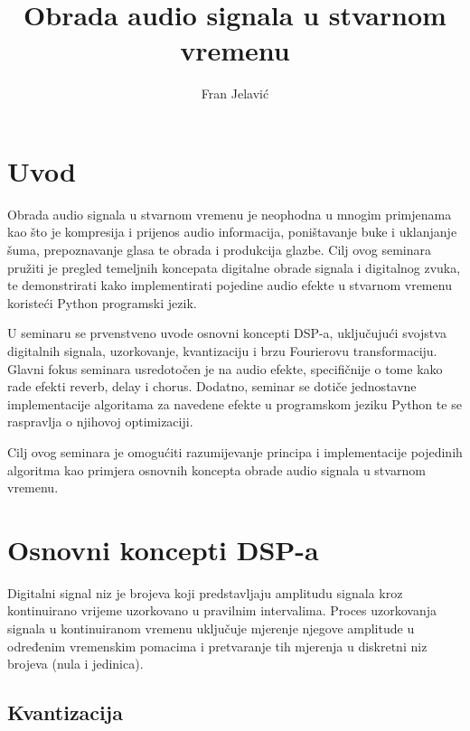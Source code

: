 \documentclass[times, utf8, seminar, numeric]{fer}
\begin{document}
\title{Obrada audio signala u stvarnom vremenu}

\author{Fran Jelavić}

\maketitle

\tableofcontents

\chapter{Uvod}

Obrada audio signala u stvarnom vremenu je neophodna u mnogim primjenama kao što je kompresija i prijenos audio informacija, poništavanje buke i uklanjanje šuma, prepoznavanje glasa te obrada i produkcija glazbe. Cilj ovog seminara pružiti je pregled temeljnih koncepata digitalne obrade signala i digitalnog zvuka, te demonstrirati kako implementirati pojedine audio efekte u stvarnom vremenu koristeći Python programski jezik.

U seminaru se prvenstveno uvode osnovni koncepti DSP-a, uključujući svojstva digitalnih signala, uzorkovanje, kvantizaciju i brzu Fourierovu transformaciju. Glavni fokus seminara usredotočen je na audio efekte, specifičnije o tome kako rade efekti reverb, delay i chorus. Dodatno, seminar se dotiče jednostavne implementacije algoritama za navedene efekte u programskom jeziku Python te se raspravlja o njihovoj optimizaciji.

Cilj ovog seminara je omogućiti razumijevanje principa i implementacije pojedinih algoritma kao primjera osnovnih koncepta obrade audio signala u stvarnom vremenu.


\chapter{Osnovni koncepti DSP-a}

Digitalni signal niz je brojeva koji predstavljaju amplitudu signala kroz kontinuirano vrijeme uzorkovano u pravilnim intervalima. Proces uzorkovanja signala u kontinuiranom vremenu uključuje mjerenje njegove amplitude u određenim vremenskim pomacima i pretvaranje tih mjerenja u diskretni niz brojeva (nula i jedinica).\cite{dueck2005digital}

\section{Kvantizacija}
\end{document}

